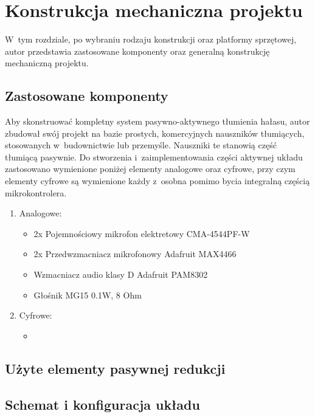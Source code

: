 \chapter{Konstrukcja mechaniczna projektu}
\label{cha:constr}
W~tym rozdziale, po wybraniu rodzaju konstrukcji oraz platformy sprzętowej, autor przedstawia zastosowane komponenty oraz generalną konstrukcję mechaniczną projektu.
\section{Zastosowane komponenty}
\label{sec:komponenty}
Aby skonstruować kompletny system pasywno-aktywnego tłumienia hałasu, autor zbudował swój projekt na bazie prostych, komercyjnych nauszników tłumiących, stosowanych w~budownictwie lub przemyśle. Nauszniki te stanowią część tłumiącą pasywnie. Do stworzenia i~zaimplementowania części aktywnej układu zastosowano wymienione poniżej elementy analogowe oraz cyfrowe, przy czym elementy cyfrowe są wymienione każdy z~osobna pomimo bycia integralną częścią mikrokontrolera.
\begin{enumerate}
	\item Analogowe:
	\begin{itemize}
		\item 2x Pojemnościowy mikrofon elektretowy CMA-4544PF-W
		\item 2x Przedwzmacniacz mikrofonowy Adafruit MAX4466
		\item Wzmacniacz audio klasy D Adafruit PAM8302
		\item Głośnik MG15 0.1W, 8 Ohm 
	\end{itemize}
	\item Cyfrowe:
	\begin{itemize}
		\item 
	\end{itemize}
\end{enumerate}
\section{Użyte elementy pasywnej redukcji}
\label{sec:usedPNC}

\section{Schemat i konfiguracja układu}
\label{sec:config}

